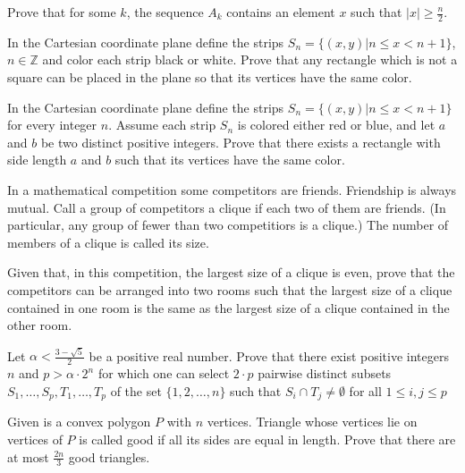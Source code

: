 Prove that for some 
$ k$, 
 the sequence 
$ A_k$
 contains an element 
$ x$
 such that 
$ |x|\geq\frac n2$.



\item[\textbf{C5.}]
In the Cartesian coordinate plane define the strips 
$ S_n = \{(x,y)|n\le x < n + 1\}$, 
$ n\in\mathbb{Z}$
 and color each strip black or white. Prove that any rectangle which is not a square can be placed in the plane so that its vertices have the same color.
 
\item[\textbf{C5'.}]

In the Cartesian coordinate plane define the strips 
$ S_n = \{(x,y)|n\le x < n + 1\}$
 for every integer 
$ n.$
 Assume each strip 
$ S_n$
 is colored either red or blue, and let 
$ a$
 and 
$ b$
 be two distinct positive integers. Prove that there exists a rectangle with side length 
$ a$
 and 
$ b$
 such that its vertices have the same color.

\item[\textbf{C6.}]
In a mathematical competition some competitors are friends. Friendship is always mutual. Call a group of competitors a 
clique
 if each two of them are friends. (In particular, any group of fewer than two competitiors is a clique.) The number of members of a clique is called its 
size.


Given that, in this competition, the largest size of a clique is even, prove that the competitors can be arranged into two rooms such that the largest size of a clique contained in one room is the same as the largest size of a clique contained in the other room.

\item[\textbf{C7.}]
Let 
$ \alpha < \frac {3 - \sqrt {5}}{2}$
 be a positive real number. Prove that there exist positive integers 
$ n$
 and 
$ p > \alpha \cdot 2^n$
 for which one can select 
$ 2 \cdot p$
 pairwise distinct subsets 
$ S_1, \ldots, S_p, T_1, \ldots, T_p$
 of the set 
$ \{1,2, \ldots, n\}$
 such that 
$ S_i \cap T_j \neq \emptyset$
 for all 
$ 1 \leq i,j \leq p$

\item[\textbf{C8.}]
Given is a convex polygon 
$ P$
 with 
$ n$
 vertices. Triangle whose vertices lie on vertices of 
$ P$
 is called 
good 
 if all its sides are equal in length. Prove that there are at most 
$ \frac {2n}{3}$
good
 triangles.

